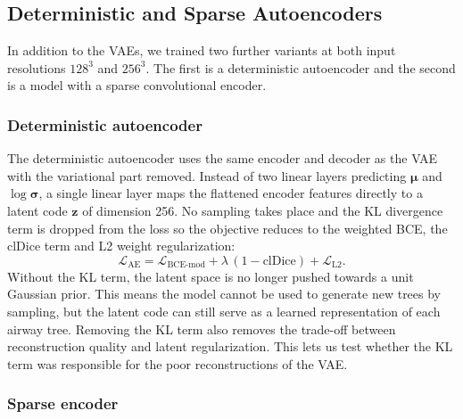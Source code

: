 
\subsection[Deterministic and sparse autoencoders]{Deterministic and Sparse Autoencoders}
\label{sec:ae}                           %

In addition to the VAEs, we trained two further variants at
both input resolutions $128^3$ and $256^3$. 
The first is a deterministic autoencoder and the second is a model with a
sparse convolutional encoder.

\subsubsection{Deterministic autoencoder}  %
\label{sec:ae_det}                       %

The deterministic autoencoder uses the same encoder and decoder as the VAE
with the variational part removed. Instead of two linear
layers predicting $\boldsymbol{\mu}$ and $\log\boldsymbol{\sigma}$, a single linear layer maps
the flattened encoder features directly to a latent code $\mathbf{z}$ of dimension
256. No sampling takes place and the KL divergence term is dropped from the loss so
the objective reduces to the weighted BCE, the clDice term and L2 weight regularization:
\begin{equation}
  \mathcal{L}_{\mathrm{AE}} = \mathcal{L}_{\mathrm{BCE\text{-}mod}}
  + \lambda\,(1 - \mathrm{clDice})
  + \mathcal{L}_{\mathrm{L2}}.
  \label{eq:ae_loss}                     %
\end{equation}
Without the KL term, the latent space is no longer pushed towards a unit Gaussian prior.
This means the model cannot be used to generate new trees by sampling, but the latent code
can still serve as a learned representation of each airway tree. Removing the KL term also
removes the trade-off between reconstruction quality and latent regularization. This lets us
test whether the KL term was responsible for the poor reconstructions of the VAE.

\subsubsection{Sparse encoder}           %
\label{sec:ae_sparse}                    %

